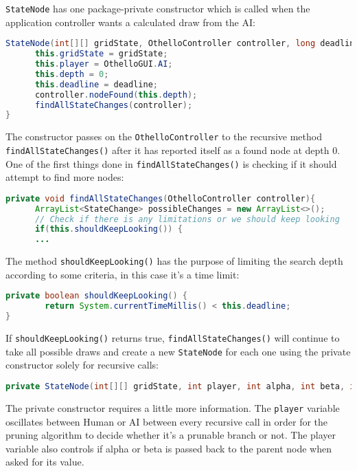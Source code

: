 \documentclass{article}
\begin{document}
\verb|StateNode| has one package-private constructor which is called when the application
controller wants a calculated draw from the AI:

\begin{lstlisting}[language=Java]
StateNode(int[][] gridState, OthelloController controller, long deadline){
      this.gridState = gridState;
      this.player = OthelloGUI.AI;
      this.depth = 0;
      this.deadline = deadline;
      controller.nodeFound(this.depth);
      findAllStateChanges(controller);
}
\end{lstlisting}

The constructor passes on the \verb|OthelloController| to the recursive method
\verb|findAllStateChanges()| after it has reported itself as a found node at depth 0.
One of the first things done in \verb|findAllStateChanges()| is checking if it should
attempt to find more nodes:

\begin{lstlisting}[language=Java]
private void findAllStateChanges(OthelloController controller){
      ArrayList<StateChange> possibleChanges = new ArrayList<>();
      // Check if there is any limitations or we should keep looking
      if(this.shouldKeepLooking()) {
      ...
\end{lstlisting}

The method \verb|shouldKeepLooking()| has the purpose of limiting the search depth
according to some criteria, in this case it's a time limit:

\begin{lstlisting}[language=Java]
private boolean shouldKeepLooking() {
        return System.currentTimeMillis() < this.deadline;
}
\end{lstlisting}

If \verb|shouldKeepLooking()| returns true, \verb|findAllStateChanges()| will continue to take
all possible draws and create a new \verb|StateNode| for each one using the private
constructor solely for recursive calls:

\begin{lstlisting}[language=Java]
private StateNode(int[][] gridState, int player, int alpha, int beta, int depth, OthelloController controller, long deadline)
\end{lstlisting}

The private constructor requires a little more information. The \verb|player|
variable oscillates between Human or AI between every recursive call in order for the
pruning algorithm to decide whether it's a prunable branch or not. The player variable
also controls if alpha or beta is passed back to the parent node when asked for its value.
\end{document}
